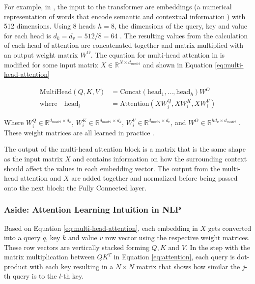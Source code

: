 For example, in \cite{vaswaniAttentionAllYou2023}, the input to the transformer are embeddings (a numerical representation of words that encode semantic and contextual information \cite{tengComprehensiveReviewCyberbullyingrelated2024}) with 512 dimensions. Using 8 heads $h=8$, the dimensions of the query, key and value for each head is $d_k = d_v = 512/8 = 64$ \cite{vaswaniAttentionAllYou2023}. The resulting values from the calculation of each head of attention are concatenated together and matrix multiplied with an output weight matrix $W^O$. The equation for multi-head attention in \cite{vaswaniAttentionAllYou2023} is modified for some input matrix $X \in \mathbb{R}^{N \times d_{model}}$ and shown in Equation \ref{eq:multi-head-attention}

\begin{equation}
    \label{eq:multi-head-attention}
    \begin{split}
        \text{MultiHead}(Q, K, V) &= \text{Concat}(\text{head}_1, ..., \text{head}_h)W^O \\
        \text{where} \quad \text{head}_i &= \text{Attention}(XW_i^Q, XW_i^K, XW_i^V)
    \end{split}
\end{equation}

Where $W_i^Q \in \mathbb{R}^{d_{model} \times d_k}$, $W_i^K \in \mathbb{R}^{d_{model} \times d_k}$, $W_i^V \in \mathbb{R}^{d_{model} \times d_v}$, and $W^O \in \mathbb{R}^{hd_{v} \times d_{model}}$ \cite{vaswaniAttentionAllYou2023}. These weight matrices are all learned in practice \cite{vaswaniAttentionAllYou2023}.

The output of the multi-head attention block is a matrix that is the same shape as the input matrix $X$ and contains information on how the surrounding context should affect the values in each embedding vector. The output from the multi-head attention and $X$ are added together and normalized before being passed onto the next block: the Fully Connected layer.

\subsubsection{Aside: Attention Learning Intuition in NLP}
Based on Equation \ref{eq:multi-head-attention}, each embedding in $X$ gets converted into a query $q$, key $k$ and value $v$ row vector using the respective weight matrices. These row vectors are vertically stacked forming $Q, K$ and $V$. In the step with the matrix multiplication between $QK^T$ in Equation \ref{eq:attention}, each query is dot-product with each key resulting in a $N \times N$ matrix that shows how similar the $j$-th query is to the $l$-th key. 

